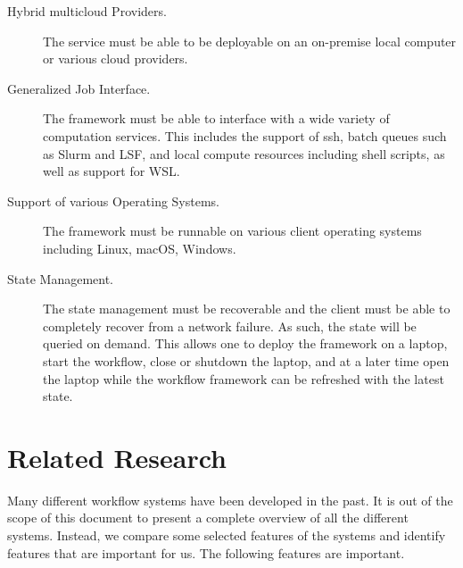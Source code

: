 \documentclass[sigplan,screen]{acmart}
\newcommand{\FILE}[1]{}
\begin{document}
\begin{description}
\item[Hybrid multicloud Providers.] The service must be able to be
deployable on an on-premise local computer or various cloud providers.

\item[Generalized Job Interface.] The framework must be able to
interface with a wide variety of computation services. This includes
the support of ssh, batch queues such as Slurm and LSF, and local
compute resources including shell scripts, as well as support for WSL.

\item[Support of various Operating Systems.] The framework must be
runnable on various client operating systems including Linux, macOS,
Windows.

\item[State Management.] The state management must be recoverable and
the client must be able to completely recover from a network failure.
As such, the state will be queried on demand. This allows one to
deploy the framework on a laptop, start the workflow, close or
shutdown the laptop, and at a later time open the laptop while the
workflow framework can be refreshed with the latest state.

\end{description}

% 

\FILE{related-research.tex}

\section{Related Research}

Many different workflow systems have been developed in the past. It is
out of the scope of this document to present a complete overview of
all the different systems. Instead, we compare some selected features
of the systems and identify features that are important for us. The
following features are important.
\end{document}

